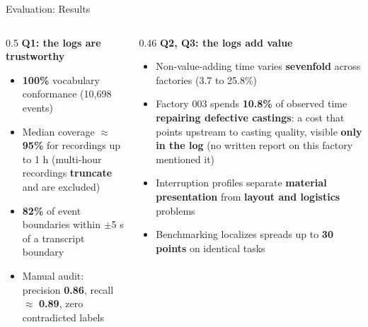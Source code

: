 \documentclass[aspectratio=169]{beamer}
\newcommand{\keyc}[1]{\textbf{\textcolor{egoblue}{#1}}}
\newcommand{\keyg}[1]{\textbf{\textcolor{egogreen!70!black}{#1}}}
\newcommand{\keya}[1]{\textbf{\textcolor{egoamber!85!black}{#1}}}
\begin{document}
\begin{frame}{Evaluation: Results}
  \begin{columns}[T]
  \begin{column}{0.5\textwidth}
    \small
    \textbf{Q1: the logs are trustworthy}
    \begin{itemize}\setlength{\itemsep}{5pt}
      \item \keyg{100\%} vocabulary conformance (10{,}698 events)
      \item Median coverage $\approx$ \keyg{95\%} for recordings up to 1 h
        (multi-hour recordings \keya{truncate} and are excluded)
      \item \keyg{82\%} of event boundaries within $\pm$5 s of a transcript
        boundary
      \item Manual audit: precision \keyg{0.86}, recall $\approx$ \keyg{0.89},
        zero contradicted labels
    \end{itemize}
  \end{column}
  \begin{column}{0.46\textwidth}
    \small
    \textbf{Q2, Q3: the logs add value}
    \begin{itemize}\setlength{\itemsep}{5pt}
      \item Non-value-adding time varies \keyc{sevenfold} across factories
        (3.7 to 25.8\%)
      \item Factory 003 spends \keya{10.8\%} of observed time
        \keya{repairing defective castings}: a cost that points upstream to
        casting quality, visible \keyg{only in the log} (no written report
        on this factory mentioned it)
      \item Interruption profiles separate \keyc{material presentation}
        from \keyc{layout and logistics} problems
      \item Benchmarking localizes spreads up to \keyc{30 points}
        on identical tasks
    \end{itemize}
  \end{column}
  \end{columns}
\end{frame}
\end{document}
